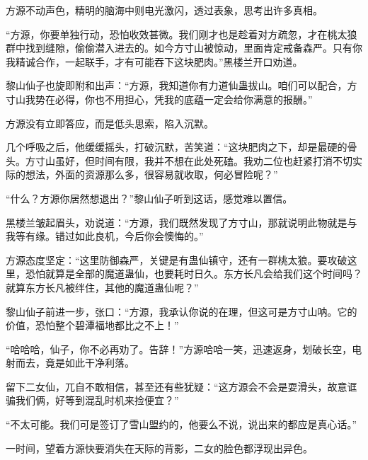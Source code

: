 \begin{this_body}
方源不动声色，精明的脑海中则电光激闪，透过表象，思考出许多真相。

“方源，你要单独行动，恐怕收效甚微。我们刚才也是趁着对方疏忽，才在桃太狼群中找到缝隙，偷偷潜入进去的。如今方寸山被惊动，里面肯定戒备森严。只有你我精诚合作，一起联手，才有可能吞下这块肥肉。”黑楼兰开口劝道。

黎山仙子也旋即附和出声：“方源，我知道你有力道仙蛊拔山。咱们可以配合，方寸山我势在必得，你也不用担心，凭我的底蕴一定会给你满意的报酬。”

方源没有立即答应，而是低头思索，陷入沉默。

几个呼吸之后，他缓缓摇头，打破沉默，苦笑道：“这块肥肉之下，却是最硬的骨头。方寸山虽好，但时间有限，我并不想在此处死磕。我劝二位也赶紧打消不切实际的想法，外面的资源那么多，很容易就收取，何必冒险呢？”

“什么？方源你居然想退出？”黎山仙子听到这话，感觉难以置信。

黑楼兰皱起眉头，劝说道：“方源，我们既然发现了方寸山，那就说明此物就是与我等有缘。错过如此良机，今后你会懊悔的。”

方源态度坚定：“这里防御森严，关键是有蛊仙镇守，还有一群桃太狼。要攻破这里，恐怕就算是全部的魔道蛊仙，也要耗时日久。东方长凡会给我们这个时间吗？就算东方长凡被绊住，其他的魔道蛊仙呢？”

黎山仙子前进一步，张口：“方源，我承认你说的在理，但这可是方寸山呐。它的价值，恐怕整个碧潭福地都比之不上！”

“哈哈哈，仙子，你不必再劝了。告辞！”方源哈哈一笑，迅速返身，划破长空，电射而去，竟是如此干净利落。

留下二女仙，兀自不敢相信，甚至还有些犹疑：“这方源会不会是耍滑头，故意诓骗我们俩，好等到混乱时机来捡便宜？”

“不太可能。我们可是签订了雪山盟约的，他要么不说，说出来的都应是真心话。”

一时间，望着方源快要消失在天际的背影，二女的脸色都浮现出异色。

\end{this_body}


